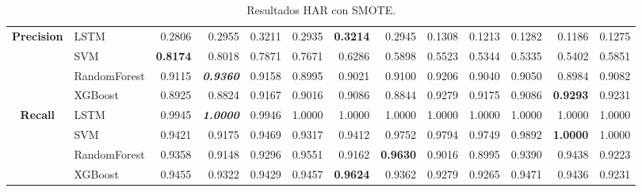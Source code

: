 \begin{table}[H]
\begin{adjustbox}{max width=12cm}
\begin{tabular}{|c|l|r|r|r|r|r|r|r|r|r|r|r|}
			\hline
			\textbf{Precision} &  LSTM &  0.2806 &  0.2955 &  0.3211 &  0.2935 & \textbf{  0.3214 } &  0.2945 &  0.1308 &  0.1213 &  0.1282 &  0.1186 &  0.1275 \\
			&  SVM & \textbf{  0.8174 } &  0.8018 &  0.7871 &  0.7671 &  0.6286 &  0.5898 &  0.5523 &  0.5344 &  0.5335 &  0.5402 &  0.5851 \\
			&  RandomForest &  0.9115 & \textit{ \textbf{  0.9360 } } &  0.9158 &  0.8995 &  0.9021 &  0.9100 &  0.9206 &  0.9040 &  0.9050 &  0.8984 &  0.9082 \\
			&  XGBoost &  0.8925 &  0.8824 &  0.9167 &  0.9016 &  0.9086 &  0.8844 &  0.9279 &  0.9175 &  0.9086 & \textbf{  0.9293 } &  0.9231 \\
			\hline
			\textbf{Recall} &  LSTM &  0.9945 & \textit{ \textbf{  1.0000 } } &  0.9946 &  1.0000 &  1.0000 &  1.0000 &  1.0000 &  1.0000 &  1.0000 &  1.0000 &  1.0000 \\
			&  SVM &  0.9421 &  0.9175 &  0.9469 &  0.9317 &  0.9412 &  0.9752 &  0.9794 &  0.9749 &  0.9892 & \textbf{  1.0000 } &  1.0000 \\
			&  RandomForest &  0.9358 &  0.9148 &  0.9296 &  0.9551 &  0.9162 & \textbf{  0.9630 } &  0.9016 &  0.8995 &  0.9390 &  0.9438 &  0.9223 \\
			&  XGBoost &  0.9455 &  0.9322 &  0.9429 &  0.9457 & \textbf{  0.9624 } &  0.9362 &  0.9279 &  0.9265 &  0.9471 &  0.9436 &  0.9231 \\
			\hline
		\end{tabular}
	\end{adjustbox}
	\caption{Resultados HAR con SMOTE.}
	\label{tab:HAR_SMOTE}
\end{table}

